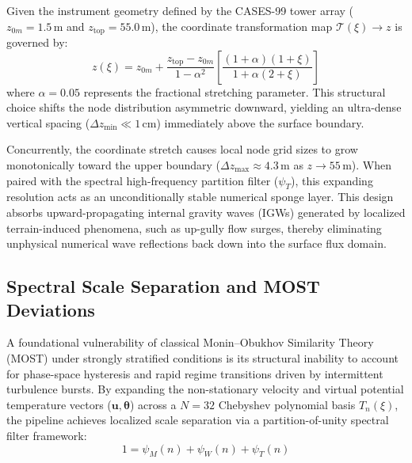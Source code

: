 Given the instrument geometry defined by the CASES-99 tower array ($z_{0m} = 1.5\,\text{m}$ and $z_{\text{top}} = 55.0\,\text{m}$), the coordinate transformation map $\mathcal{T}(\xi) \rightarrow z$ is governed by:
\begin{equation}
z(\xi) = z_{0m} + \frac{z_{\text{top}} - z_{0m}}{1 - \alpha^2} \left[ \frac{(1+\alpha)(1+\xi)}{1 + \alpha(2+\xi)} \right]
\end{equation}
where $\alpha = 0.05$ represents the fractional stretching parameter. This structural choice shifts the node distribution asymmetric downward, yielding an ultra-dense vertical spacing ($\Delta z_{\text{min}} \ll 1\,\text{cm}$) immediately above the surface boundary.

Concurrently, the coordinate stretch causes local node grid sizes to grow monotonically toward the upper boundary ($\Delta z_{\text{max}} \approx 4.3\,\text{m}$ as $z \rightarrow 55\,\text{m}$). When paired with the spectral high-frequency partition filter ($\psi_T$), this expanding resolution acts as an unconditionally stable numerical sponge layer. This design absorbs upward-propagating internal gravity waves (IGWs) generated by localized terrain-induced phenomena, such as up-gully flow surges, thereby eliminating unphysical numerical wave reflections back down into the surface flux domain.

\subsection{Spectral Scale Separation and MOST Deviations}
A foundational vulnerability of classical Monin--Obukhov Similarity Theory (MOST) under strongly stratified conditions is its structural inability to account for phase-space hysteresis and rapid regime transitions driven by intermittent turbulence bursts. By expanding the non-stationary velocity and virtual potential temperature vectors ($\mathbf{u}, \boldsymbol{\theta}$) across a $N=32$ Chebyshev polynomial basis $T_n(\xi)$, the pipeline achieves localized scale separation via a partition-of-unity spectral filter framework:
\begin{equation}
1 = \psi_M(n) + \psi_W(n) + \psi_T(n)
\end{equation}

